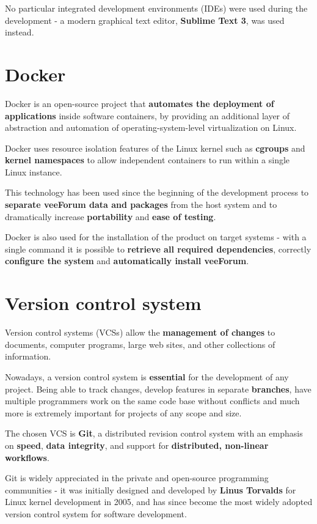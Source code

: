 \documentclass[12pt]{report}
\renewcommand\emph{\textbf}
\begin{document}
                No particular integrated development environments (IDEs) were used during the development - a modern graphical text editor, \emph{Sublime Text 3}, was used instead.

            \section{Docker}
                Docker is an open-source project that \emph{automates the deployment of applications} inside software containers, by providing an additional layer of abstraction and automation of operating-system-level virtualization on Linux.

                Docker uses resource isolation features of the Linux kernel such as \emph{cgroups} and \emph{kernel namespaces} to allow independent containers to run within a single Linux instance.

                This technology has been used since the beginning of the development process to \emph{separate veeForum data and packages} from the host system and to dramatically increase \emph{portability} and \emph{ease of testing}.

                Docker is also used for the installation of the product on target systems - with a single command it is possible to \emph{retrieve all required dependencies}, correctly \emph{configure the system} and \emph{automatically install veeForum}.

            \section{Version control system}
                Version control systems (VCSs) allow the \emph{management of changes} to documents, computer programs, large web sites, and other collections of information.

                Nowadays, a version control system is \emph{essential} for the development of any project.
                Being able to track changes, develop features in separate \emph{branches}, have multiple programmers work on the same code base without conflicts and much more is extremely important for projects of any scope and size.

                The chosen VCS is \emph{Git}, a distributed revision control system with an emphasis on \emph{speed}, \emph{data integrity}, and support for \emph{distributed, non-linear workflows}.

                Git is widely appreciated in the private and open-source programming communities - it was initially designed and developed by \emph{Linus Torvalds} for Linux kernel development in 2005, and has since become the most widely adopted version control system for software development.
\end{document}
